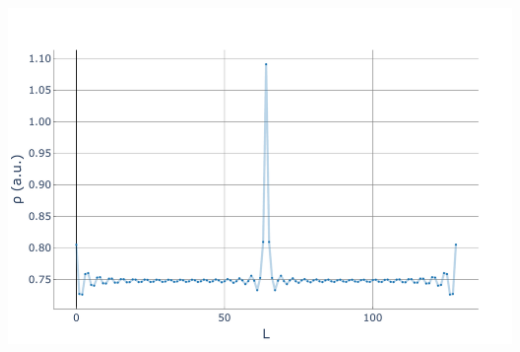 \documentclass[aspectratio=169]{beamer}
\begin{document}
\begin{frame}
\begin{onlyenv}
\begin{center}
      \includegraphics[scale=0.22]{../img/Density-profiles-fractional-impurity.pdf}
    \end{center}
  \end{onlyenv}
\end{frame}
\end{document}
